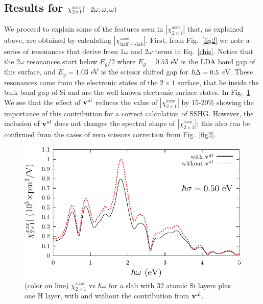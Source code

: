 \documentclass[floatfix,prb,aps,superscriptaddress,showpacs,11pt,preprint,letterpaper]{revtex4}
\begin{document}
\subsection{\texorpdfstring{Results for $\chi^{xxx}_{2\times 1}(-2\omega;\omega,\omega)$}
{Results for Xxxx(2x1)(-2w;w,w)}}

We proceed to explain 
some of the features seen in $|\chi^{xxx}_{2\times 1}|$ that, as
explained above, are obtained 
by calculating $|\chi^{xxx}_{\mathrm{half-slab}}|$.
First, from Fig.~\ref{fig2} we note a series of resonances 
that derive from 1$\omega$ and 2$\omega$ terms in
Eq.~\eqref{chis}. 
Notice that the 
2$\omega$ resonances start below $E_g/2$ where $E_g=0.53$ eV is the LDA
band gap of this surface, and $E_g=1.03$ eV is the scissor shifted gap for
$\hbar\Delta=0.5$ eV.
These resonances
come from the electronic states of the 
$2\times 1$ surface, that lie inside the bulk band gap of Si and are the 
well known electronic surface states.
In Fig.~\ref{fig3}
We see that the effect of $\mathbf{v}^{\mathrm{nl}}$
 reduces the value of   
$|\chi^{xxx}_{2\times 1}|$  
by 15-20\% 
showing the importance of this contribution for a correct calculation  
of SSHG.  
However, the inclusion of $\mathbf{v}^{\mathrm{nl}}$ does not
changes the 
spectral shape of $|\chi^{xxx}_{2\times 1}|$;
 this also can be confirmed from
the cases of zero scissors correction from Fig.~\ref{fig2}.
%
\begin{figure}
\centering 
\includegraphics[scale=.8]{plots/fig3}
\caption{(color on line) 
$\chi^{xxx}_{2\times 1}$
vs $\hbar\omega$ for a slab with 32 
atomic Si layers plus one H layer, 
with and without the contribution from $\mathbf{v}^{\mathrm{nl}}$.
\label{fig3}} 
\end{figure}
\end{document}
